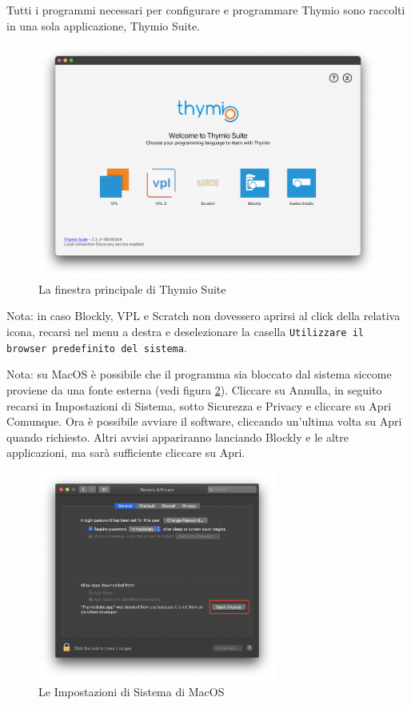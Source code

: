 \documentclass[12pt]{article}
\begin{document}
Tutti i programmi necessari per configurare e programmare Thymio sono raccolti in una sola applicazione, Thymio Suite.

\begin{figure}[H]
	\includegraphics[width=\textwidth]{img/thymioSuite.png}
	\caption{La finestra principale di Thymio Suite}
	\label{aseba1}
\end{figure}

Nota: in caso Blockly, VPL e Scratch non dovessero aprirsi al click della relativa icona, recarsi nel menu a destra e deselezionare la casella \texttt{Utilizzare il browser predefinito del sistema}.

\newpage

Nota: su MacOS è possibile che il programma sia bloccato dal sistema siccome proviene da una fonte esterna (vedi figura \ref{macErr}). Cliccare su Annulla, in seguito recarsi in Impostazioni di Sistema, sotto Sicurezza e Privacy e cliccare su Apri Comunque. Ora è possibile avviare il software, cliccando un'ultima volta su Apri quando richiesto. Altri avvisi appariranno lanciando Blockly e le altre applicazioni, ma sarà sufficiente cliccare su Apri.

\begin{figure}[H]
	\centering
	\includegraphics[width=0.7\textwidth]{img/macWarn.png}
	\caption{Le Impostazioni di Sistema di MacOS}
	\label{macErr}
\end{figure}
\end{document}
